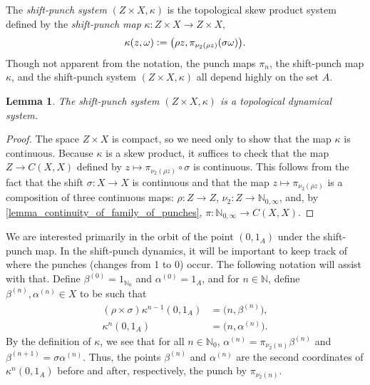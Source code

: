 \documentclass[letter,11pt]{article}
\theoremstyle{plain}
\newtheorem{lemma}[theorem]{Lemma}
\theoremstyle{definition}
\theoremstyle{plain}
\theoremstyle{plain}
\numberwithin{equation}{section}
\newcommand{\N}{\mathbb{N}}
\newcommand{\defeq}{\vcentcolon=}
\newcommand{\odometer}{Z}
\newcommand{\orotation}{\rho}
\newcommand{\bpunch}{\beta}
\newcommand{\apunch}{\alpha}
\begin{document}
The \emph{shift-punch system} $(\odometer \times X, \kappa)$ is the topological skew product system defined by the \emph{shift-punch map} $\kappa: \odometer \times X \to \odometer \times X$,
\[\kappa(z,\omega) \defeq \big(\orotation z, \pi_{\nu_2( \orotation z)}(\sigma \omega) \big).\]
Though not apparent from the notation, the punch maps $\pi_n$, the shift-punch map $\kappa$, and the shift-punch system $(\odometer \times X, \kappa)$ all depend highly on the set $A$.

\begin{lemma}
    The shift-punch system $(\odometer \times X, \kappa)$ is a topological dynamical system.
\end{lemma}

\begin{proof}
    The space $Z \times X$ is compact, so we need only to show that the map $\kappa$ is continuous.  Because $\kappa$ is a skew product, it suffices to check that the map $\odometer \to C(X,X)$ defined by $z \mapsto \pi_{\nu_2(\orotation z)} \circ \sigma$ is continuous.  This follows from the fact that the shift $\sigma: X \to X$ is continuous and that the map $z \mapsto \pi_{\nu_2(\orotation z)}$ is a composition of three continuous maps: $\orotation: \odometer \to \odometer$, $\nu_2: \odometer \to \N_{0,\infty}$, and, by \cref{lemma_continuity_of_family_of_punches}, $\pi: \N_{0,\infty} \to C(X,X)$.
\end{proof}


We are interested primarily in the orbit of the point $(0,1_A)$ under the shift-punch map.  In the shift-punch dynamics, it will be important to keep track of where the punches (changes from 1 to 0) occur.  The following notation will assist with that.  Define $\bpunch^{(0)} = 1_{\N_0}$ and $\apunch^{(0)} = 1_A$, and for $n \in \N$, define $\bpunch^{(n)}, \apunch^{(n)} \in X$ to be such that
\begin{align*}
    (\orotation \times \sigma) \kappa^{n-1}(0,1_A) &= \big(n, \bpunch^{(n)}\big),\\
    \kappa^n (0,1_A) &= \big(n, \apunch^{(n)} \big).
\end{align*}
By the definition of $\kappa$, we see that for all $n \in \N_0$, $\apunch^{(n)} = \pi_{\nu_2(n)} \bpunch^{(n)}$ and $\bpunch^{(n+1)} = \sigma \apunch^{(n)}$.
Thus, the points $\bpunch^{(n)}$ and $\apunch^{(n)}$ are the second coordinates of $\kappa^{n}(0, 1_A)$ before and after, respectively, the punch by $\pi_{\nu_2(n)}$.
\end{document}
